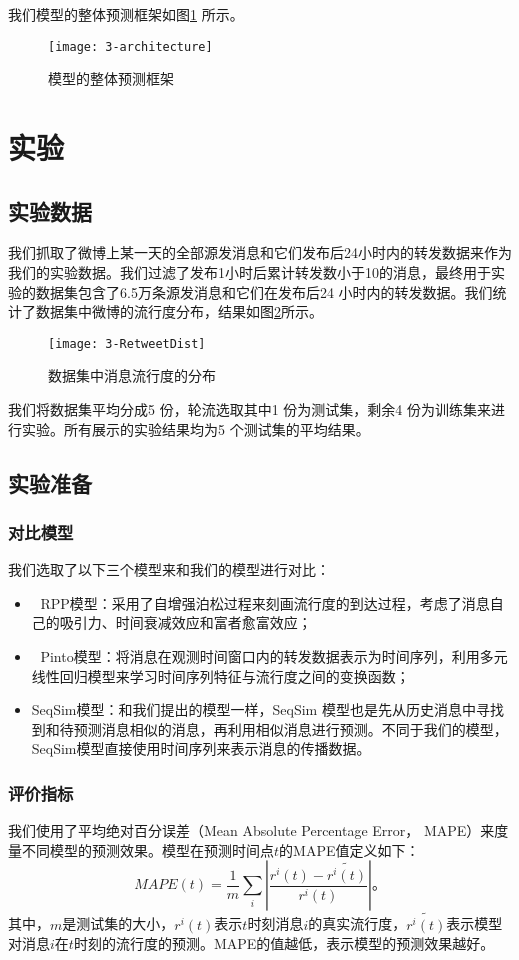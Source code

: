 我们模型的整体预测框架如图\ref{fig:architecture} 所示。
\begin{figure}[!htbp]
  \centering
  \texttt{[image: 3-architecture]}
  \caption{模型的整体预测框架}
  \label{fig:architecture}
\end{figure}

\section{实验}
\subsection{实验数据}
我们抓取了微博上某一天的全部源发消息和它们发布后24小时内的转发数据来作为我们的实验数据。我们过滤了发布1小时后累计转发数小于10的消息，最终用于实验的数据集包含了6.5万条源发消息和它们在发布后24 小时内的转发数据。我们统计了数据集中微博的流行度分布，结果如图\ref{fig:retweetDist}所示。
\begin{figure}[!htbp]
  \centering
  \texttt{[image: 3-RetweetDist]}
  \caption{数据集中消息流行度的分布}
  \label{fig:retweetDist}
\end{figure}

我们将数据集平均分成5 份，轮流选取其中1 份为测试集，剩余4 份为训练集来进行实验。所有展示的实验结果均为5 个测试集的平均结果。
\subsection{实验准备}
\subsubsection{对比模型}
我们选取了以下三个模型来和我们的模型进行对比：
\begin{itemize}
\item 	RPP模型\citep{shen2014modeling}：采用了自增强泊松过程来刻画流行度的到达过程，考虑了消息自己的吸引力、时间衰减效应和富者愈富效应；
\item 	Pinto模型\citep{pinto2013using}：将消息在观测时间窗口内的转发数据表示为时间序列，利用多元线性回归模型来学习时间序列特征与流行度之间的变换函数；
\item SeqSim模型：和我们提出的模型一样，SeqSim 模型也是先从历史消息中寻找到和待预测消息相似的消息，再利用相似消息进行预测。不同于我们的模型，SeqSim模型直接使用时间序列来表示消息的传播数据。
\end{itemize}
\subsubsection{评价指标}
我们使用了平均绝对百分误差（Mean Absolute Percentage Error， MAPE）来度量不同模型的预测效果。模型在预测时间点$t$的MAPE值定义如下：
 \begin{displaymath}
 MAPE(t)=\frac{1}{m}\sum_{i} |\frac{r^i (t)-\widetilde{r^i (t)}}{r^i (t)}|\text{。}
 \end{displaymath}
其中，$m$是测试集的大小，$r^i (t)$表示$t$时刻消息$i$的真实流行度，$\widetilde{r^i (t)}$表示模型对消息$i$在$t$时刻的流行度的预测。MAPE的值越低，表示模型的预测效果越好。
